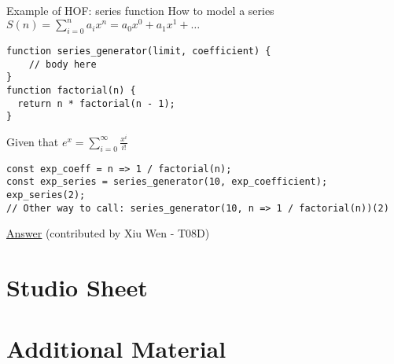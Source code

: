\documentclass[10pt]{beamer}
\begin{document}
\begin{frame}[fragile]{Example of HOF: series function}
How to model a series $S(n) = \sum_{i=0}^n a_i x^n = a_0 x^0 + a_1 x^1 + \hdots$
\begin{verbatim}
function series_generator(limit, coefficient) {
    // body here
}
function factorial(n) {
  return n * factorial(n - 1);
}
\end{verbatim}

Given that $e^x = \sum_{i=0}^{\infty} \frac{x^i}{i!}$

\begin{verbatim}
const exp_coeff = n => 1 / factorial(n);
const exp_series = series_generator(10, exp_coefficient);
exp_series(2);
// Other way to call: series_generator(10, n => 1 / factorial(n))(2)
\end{verbatim}
\href{https://share.sourceacademy.nus.edu.sg/series}{\underline{Answer}} (contributed by Xiu Wen - T08D)
\end{frame}


\section[Studio Sheet (and Photo Taking)]{Studio Sheet}


\section[Additional Material]{Additional Material}
\end{document}
